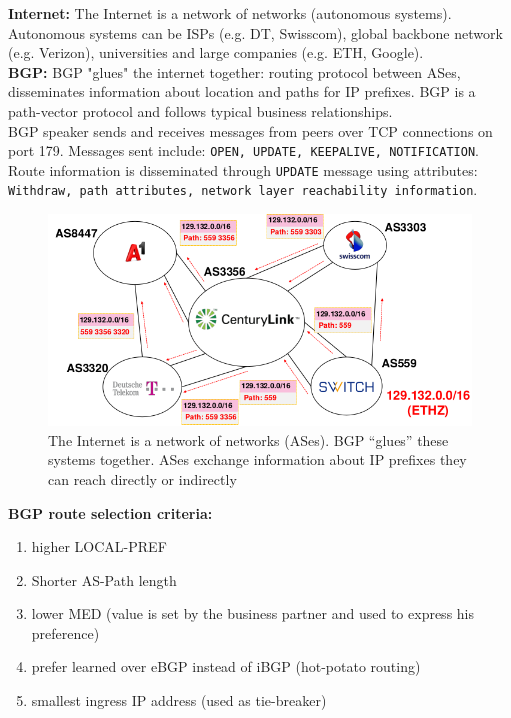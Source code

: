 \documentclass[11pt,oneside,a4paper]{article}
\begin{document}
\noindent \textbf{Internet:} The Internet is a network of networks (autonomous systems). Autonomous systems can be ISPs (e.g. DT, Swisscom), global backbone network (e.g. Verizon), universities and large companies (e.g. ETH, Google).\\

\noindent \textbf{BGP:} BGP "glues" the internet together: routing protocol between ASes, disseminates information about location and paths for IP prefixes. BGP is a path-vector protocol and follows typical business relationships.\\
BGP speaker sends and receives messages from peers over TCP connections on port 179. Messages sent include: \texttt{OPEN, UPDATE, KEEPALIVE, NOTIFICATION}. Route information is disseminated through \texttt{UPDATE} message using attributes: \texttt{Withdraw, path attributes, network layer reachability information}.\\

\begin{figure}
	\centering
	\includegraphics[width=0.6\linewidth]{figures/bgp_ases}
	\caption{The Internet is a network of networks (ASes). BGP “glues” these systems together. ASes exchange information about IP prefixes they can reach directly or indirectly}
	\label{fig:bgpases}
\end{figure}

\noindent \textbf{BGP route selection criteria:}

\vspace{-\topsep}
\begin{enumerate}
	\setlength{\itemsep}{0pt}
	\setlength{\parskip}{0pt}
	\item higher LOCAL-PREF
	\item Shorter AS-Path length
	\item lower MED (value is set by the business partner and used to express his preference)
	\item prefer learned over eBGP instead of iBGP (hot-potato routing)
	\item smallest ingress IP address (used as tie-breaker)
\end{enumerate}
\vspace{-\topsep}
\end{document}
